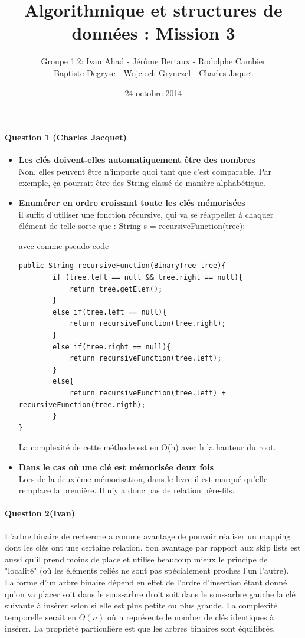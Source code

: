 \documentclass[a4paper]{article}
\title{Algorithmique et structures de données : Mission 3}
\date{24 octobre 2014}
\author{Groupe 1.2: Ivan Ahad - Jérôme Bertaux - Rodolphe Cambier \\ 
	Baptiste Degryse - Wojciech Grynczel - Charles Jaquet}
\begin{document}
\maketitle

\paragraph*{Question 1 (Charles Jacquet)}
\begin{itemize}
\item{\textbf{Les clés doivent-elles automatiquement être des nombres}}\\
Non, elles peuvent être n'importe quoi tant que c'est comparable.
Par exemple, ça pourrait être des String classé de manière alphabétique.
\item{\textbf{Enumérer en ordre croissant toute les clés mémorisées}}\\
il suffit d'utiliser une fonction récursive, qui va se réappeller à chaquer élément de telle sorte que :
String s = recursiveFunction(tree);

avec comme pseudo code
\begin{verbatim}
public String recursiveFunction(BinaryTree tree){
		if (tree.left == null && tree.right == null){
			return tree.getElem();
		}
		else if(tree.left == null){
			return recursiveFunction(tree.right);
		}
		else if(tree.right == null){
			return recursiveFunction(tree.left);
		}
		else{
			return recursiveFunction(tree.left) + recursiveFunction(tree.rigth);
		}
}
\end{verbatim}
La complexité de cette méthode est en O(h) avec h la hauteur du root.

\item{\textbf{Dans le cas où une clé est mémorisée deux fois}}\\
Lors de la deuxième mémorisation, dans le livre il est marqué qu'elle remplace la première. Il n'y a donc pas de relation père-fils.

\end{itemize}
\paragraph*{Question 2(Ivan)}

L'arbre binaire de recherche a comme avantage de pouvoir réaliser un mapping dont les clés ont une certaine relation. Son avantage par rapport aux skip lists est aussi qu'il prend moins de place et utilise beaucoup mieux le principe de "localité" (où les éléments reliés ne sont pas spécialement proches l'un l'autre).
\\
La forme d'un arbre binaire dépend en effet de l'ordre d'insertion étant donné qu'on va placer soit dans le sous-arbre droit soit dans le sous-arbre gauche la clé suivante à insérer selon si elle est plus petite ou plus grande. La complexité temporelle serait en $\Theta(n)$ où n représente le nomber de clés identiques à insérer. La propriété particulière est que les arbres binaires sont équilibrés. 
\end{document}

